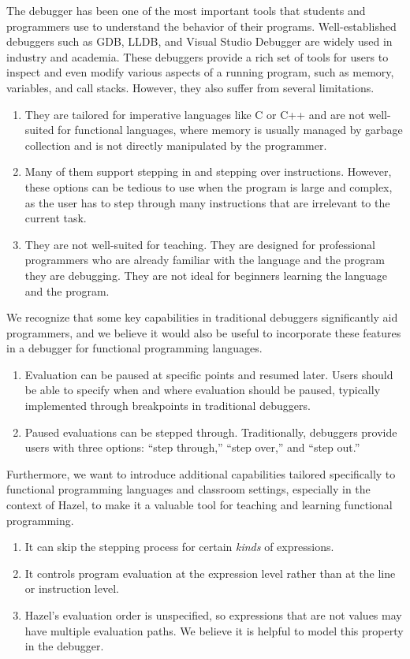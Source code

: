 The debugger has been one of the most important tools that students and programmers
use to understand the behavior of their programs. Well-established debuggers such as
GDB, LLDB, and Visual Studio Debugger are widely used in industry and
academia. These debuggers provide a rich set of tools for users to inspect and even
modify various aspects of a running program, such as memory, variables,
and call stacks. However, they also suffer from several limitations.

\begin{enumerate}
  \item They are tailored for imperative languages like C or C++ and are not
    well-suited for functional languages, where memory is usually managed by
    garbage collection and is not directly manipulated by the programmer.
  \item Many of them support stepping in and stepping over instructions. However,
    these options can be tedious to use when the program is large and
    complex, as the user has to step through many instructions that are irrelevant
    to the current task.
  \item They are not well-suited for teaching. They are designed for professional
    programmers who are already familiar with the language and the program they
    are debugging. They are not ideal for beginners learning the
    language and the program.
\end{enumerate}

We recognize that some key capabilities in traditional debuggers
significantly aid programmers, and we believe it would also be useful to incorporate
these features in a debugger for functional programming languages.
\begin{enumerate}
  \item Evaluation can be paused at specific points and resumed later. Users
    should be able to specify when and where evaluation should be paused, typically
    implemented through breakpoints in traditional debuggers.
  \item Paused evaluations can be stepped through. Traditionally, debuggers provide
    users with three options: ``step through,'' ``step over,'' and ``step out.''
\end{enumerate}

Furthermore, we want to introduce additional capabilities tailored specifically to functional
programming languages and classroom settings, especially in the context of Hazel, to make it a
valuable tool for teaching and learning functional programming.
\begin{enumerate}
  \item It can skip the stepping process for certain \emph{kinds} of expressions.
  \item It controls program evaluation at the expression level rather than at
    the line or instruction level.
  \item Hazel’s evaluation order is unspecified, so expressions that are not values
    may have multiple evaluation paths. We believe it is helpful to model this property
    in the debugger.
\end{enumerate}

